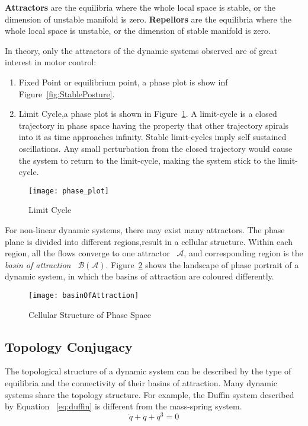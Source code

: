 \textbf{Attractors} are the equilibria where the whole local space is stable, or the dimension of unstable manifold is zero.
\textbf{Repellors} are the equilibria where the whole local space is unstable, or the dimension of stable manifold is zero.







In theory, only the attractors of the dynamic systems  observed are of great interest in motor control:
\begin{enumerate}
 \item Fixed Point or equilibrium point, a phase plot  is show inf Figure~\ref{fig:StablePosture}.
 \item Limit Cycle,a phase plot is shown in Figure~\ref{fig:ecycle}.
 A limit-cycle  is a closed trajectory in phase space having the property that other trajectory spirals into it as time approaches infinity.
Stable limit-cycles imply self sustained oscillations. Any small perturbation from the closed trajectory would cause the system to return to the limit-cycle, making the system stick to the limit-cycle.
\end{enumerate}

\begin{figure}
	\begin{center}
	\texttt{[image: phase\_plot]}
	\end{center}
	\caption{Limit Cycle}
	\label{fig:ecycle}
\end{figure}





For non-linear dynamic systems, there may exist many attractors.
The phase plane is divided into different regions,result in a cellular structure.
Within each region, all the flows converge to one attractor ~$\mathcal{A}$,
and corresponding region is  the \emph{basin of attraction} ~$\mathcal{B}(\mathcal{A})$.
Figure~\ref{fig:manyboa} shows the landscape of phase portrait of a dynamic system, in which the basins of attraction are coloured differently.
\begin{figure}
\begin{center}
\texttt{[image: basinOfAttraction]}
\end{center}
\caption{Cellular Structure of Phase Space}
\label{fig:manyboa}
\end{figure}




\subsection{Topology Conjugacy}
The topological structure of a dynamic system can be described by the type of equilibria and the connectivity of their basins of attraction.
Many dynamic systems share the topology structure.
For example, the Duffin system described by Equation ~\ref{eq:duffin} is different from the mass-spring system.
\begin{equation}
\label{eq:duffin}
\ddot{q}+q+q^{3}=0
\end{equation}

